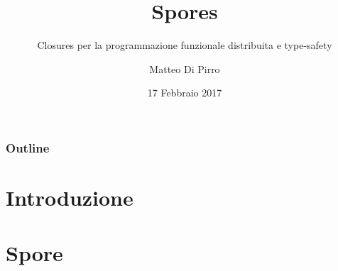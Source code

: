 \documentclass{beamer}
\title{Spores}
\subtitle{\newline Closures per la programmazione funzionale distribuita e type-safety}
\author{Matteo Di Pirro}
\date{17 Febbraio 2017}
\institute{Università degli Studi di Padova}
\begin{document}
\newcommand{\turnOffNumbers}{true} %

\begin{frame}[noframenumbering]
\titlepage
\end{frame}

\let\turnOffNumbers\empty
\begin{frame}
	\frametitle{Outline}
	\tableofcontents
\end{frame}

\section{Introduzione}


\section{Spore}


\appendix
\makethanks
\renewcommand{\turnOffNumbers}{true} %
\end{document}
